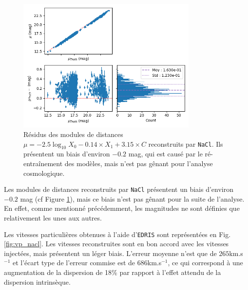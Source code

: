 \documentclass{book}
\def\nacl{\texttt{NaCl}\xspace}
\def\edris{\texttt{EDRIS}\xspace}
\begin{document}
\begin{figure}[h]
    \centering
    \includegraphics[width=0.8\textwidth]{figures/nacl_mu.png}
    \caption{Résidus des modules de distances $\mu = -2.5\log_{10} X_0 - 0.14 \times X_1 + 3.15 \times  C$ reconstruits par \nacl. Ils présentent un biais d'environ $-0.2$ mag, qui est causé par le ré-entraînement des modèles, mais n'est pas gênant pour l'analyse cosmologique.}
    \label{fig:nacl_mu}
\end{figure}
Les modules de distances reconstruits par \nacl présentent un biais d'environ $-0.2$ mag (cf Figure \ref{fig:nacl_mu}), mais ce biais n'est pas gênant pour la suite de l'analyse. En effet, comme mentionné précédemment, les magnitudes ne sont définies que relativement les unes aux autres.

Les vitesses particulières obtenues à l'aide d'\edris sont représentées en Fig. \ref{fig:vp_nacl}. Les vitesses reconstruites sont en bon accord avec les vitesses injectées, mais présentent un léger biais. L'erreur moyenne n'est que de $265$km.s$^{-1}$ et l'écart type de l'erreur commise est de $686$km.s$^{-1}$, ce qui correspond à une augmentation de la dispersion de 18\% par rapport à l'effet attendu de la dispersion intrinsèque.
\end{document}
